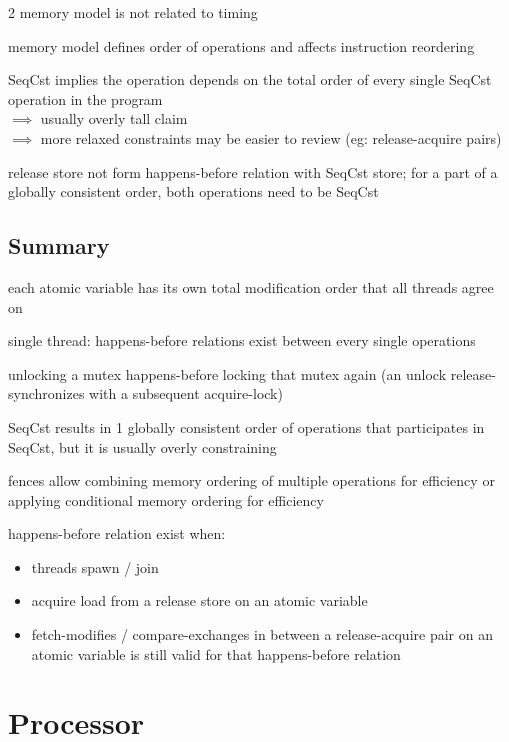 \documentclass[8pt]{extarticle}
\begin{document}
\begin{multicols*}{2}
    memory model is not related to timing

    memory model defines order of operations and affects instruction reordering

    SeqCst implies the operation depends on the total order of every single SeqCst operation in the program\\
    $\implies$ usually overly tall claim\\
    $\implies$ more relaxed constraints may be easier to review (eg: release-acquire pairs)

    release store not form happens-before relation with SeqCst store; for a part of a globally consistent order, both operations need to be SeqCst

    \subsection{Summary}

    each atomic variable has its own total modification order that all threads agree on

    single thread: happens-before relations exist between every single operations

    unlocking a mutex happens-before locking that mutex again (an unlock release-synchronizes with a subsequent acquire-lock)

    SeqCst results in 1 globally consistent order of operations that participates in SeqCst, but it is usually overly constraining

    fences allow combining memory ordering of multiple operations for efficiency or applying conditional memory ordering for efficiency

    happens-before relation exist when:
    \begin{itemize}
    \item threads spawn / join
    \item acquire load from a release store on an atomic variable
    \item fetch-modifies / compare-exchanges in between a release-acquire pair on an atomic variable is still valid for that happens-before relation
    \end{itemize}

    \vfill\null
    \columnbreak

    \section{Processor}


\end{multicols*}
\end{document}
